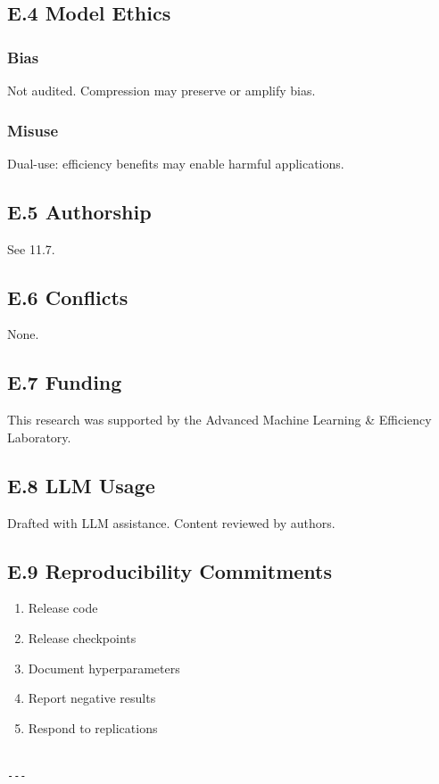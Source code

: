 \subsection{E.4 Model Ethics}

\subsubsection{Bias}
Not audited. Compression may preserve or amplify bias.

\subsubsection{Misuse}
Dual-use: efficiency benefits may enable harmful applications.

\subsection{E.5 Authorship}

See  11.7.

\subsection{E.6 Conflicts}

None.

\subsection{E.7 Funding}

This research was supported by the Advanced Machine Learning \& Efficiency Laboratory.

\subsection{E.8 LLM Usage}

Drafted with LLM assistance. Content reviewed by authors.

\subsection{E.9 Reproducibility Commitments}

\begin{enumerate}
\item Release code
\item Release checkpoints
\item Document hyperparameters
\item Report negative results
\item Respond to replications
\end{enumerate}
\begin{lstlisting}

---
\end{lstlisting}